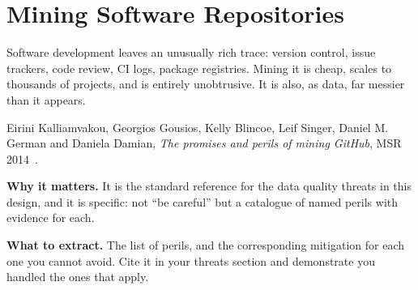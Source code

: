 \section{Mining Software Repositories}

Software development leaves an unusually rich trace: version control, issue
trackers, code review, CI logs, package registries. Mining it is cheap, scales
to thousands of projects, and is entirely unobtrusive. It is also, as data, far
messier than it appears.

\begin{paperbox}
Eirini Kalliamvakou, Georgios Gousios, Kelly Blincoe, Leif Singer, Daniel M.
German and Daniela Damian, \emph{The promises and perils of mining GitHub},
MSR 2014~\cite{kalliamvakou2014promises}.

\medskip
\textbf{Why it matters.} It is the standard reference for the data quality
threats in this design, and it is specific: not ``be careful'' but a catalogue
of named perils with evidence for each.

\medskip
\textbf{What to extract.} The list of perils, and the corresponding mitigation
for each one you cannot avoid. Cite it in your threats section and demonstrate
you handled the ones that apply.
\end{paperbox}

